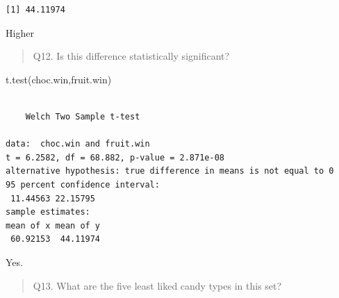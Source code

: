 \documentclass[
  letterpaper,
  DIV=11,
  numbers=noendperiod]{scrartcl}
\newenvironment{Shaded}{\begin{snugshade}}{\end{snugshade}}
\newcommand{\AttributeTok}[1]{\textcolor[rgb]{0.40,0.45,0.13}{#1}}
\newcommand{\DecValTok}[1]{\textcolor[rgb]{0.68,0.00,0.00}{#1}}
\newcommand{\FunctionTok}[1]{\textcolor[rgb]{0.28,0.35,0.67}{#1}}
\newcommand{\NormalTok}[1]{\textcolor[rgb]{0.00,0.23,0.31}{#1}}
\newcommand{\OtherTok}[1]{\textcolor[rgb]{0.00,0.23,0.31}{#1}}
\newcommand{\SpecialCharTok}[1]{\textcolor[rgb]{0.37,0.37,0.37}{#1}}
\begin{document}
\begin{verbatim}
[1] 44.11974
\end{verbatim}

Higher

\begin{quote}
Q12. Is this difference statistically significant?
\end{quote}

\begin{Shaded}
\end{Shaded}

\begin{Shaded}
\begin{Highlighting}[]
\FunctionTok{t.test}\NormalTok{(choc.win,fruit.win)}
\end{Highlighting}
\end{Shaded}

\begin{verbatim}

    Welch Two Sample t-test

data:  choc.win and fruit.win
t = 6.2582, df = 68.882, p-value = 2.871e-08
alternative hypothesis: true difference in means is not equal to 0
95 percent confidence interval:
 11.44563 22.15795
sample estimates:
mean of x mean of y 
 60.92153  44.11974 
\end{verbatim}

Yes.

\begin{quote}
Q13. What are the five least liked candy types in this set?
\end{quote}

\begin{Shaded}
\end{Shaded}
\end{document}
